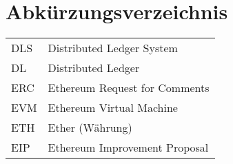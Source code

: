 
\section{Abkürzungsverzeichnis}

\begin{longtable}{p{6 cm}p{9 cm}}
    DLS & Distributed Ledger System \\
    DL & Distributed Ledger \\
    ERC & Ethereum Request for Comments \\
    EVM & Ethereum Virtual Machine \\
    ETH & Ether (Währung) \\
    EIP & Ethereum Improvement Proposal \\
\end{longtable}

   